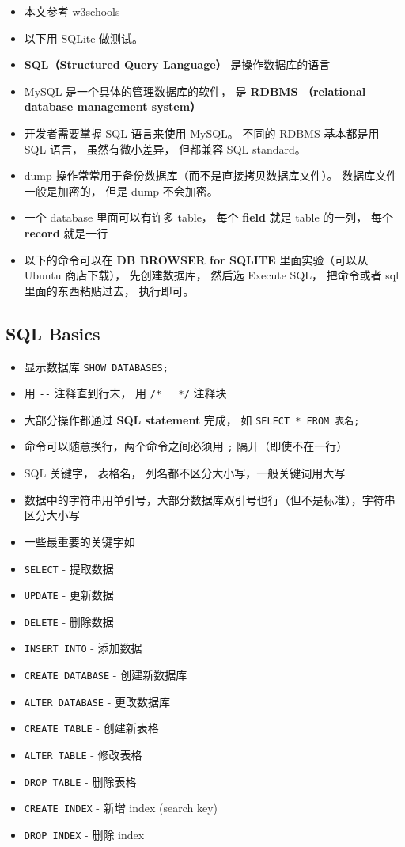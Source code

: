 
\begin{issues}
\issueDraft
\end{issues}

\begin{itemize}
\item 本文参考 \href{https://www.w3schools.com/sql/default.asp}{w3schools}
\item 以下用 SQLite 做测试。
\item \textbf{SQL（Structured Query Language）} 是操作数据库的语言
\item MySQL 是一个具体的管理数据库的软件， 是 \textbf{RDBMS （relational database management system）}
\item 开发者需要掌握 SQL 语言来使用 MySQL。 不同的 RDBMS 基本都是用 SQL 语言， 虽然有微小差异， 但都兼容 SQL standard。
\item dump 操作常常用于备份数据库（而不是直接拷贝数据库文件）。 数据库文件一般是加密的， 但是 dump 不会加密。
\item 一个 database 里面可以有许多 table， 每个 \textbf{field} 就是 table 的一列， 每个 \textbf{record} 就是一行
\item 以下的命令可以在 \textbf{DB BROWSER for SQLITE} 里面实验（可以从 Ubuntu 商店下载）， 先创建数据库， 然后选 Execute SQL， 把命令或者 sql 里面的东西粘贴过去， 执行即可。
\end{itemize}

\subsection{SQL Basics}
\begin{itemize}
\item 显示数据库 \verb`SHOW DATABASES;`
\item 用 \verb|--| 注释直到行末， 用 \verb|/*   */| 注释块
\item 大部分操作都通过 \textbf{SQL statement} 完成， 如 \verb`SELECT * FROM 表名;`
\item 命令可以随意换行，两个命令之间必须用 \verb|;| 隔开（即使不在一行）
\item SQL 关键字， 表格名， 列名都不区分大小写，一般关键词用大写
\item 数据中的字符串用单引号，大部分数据库双引号也行（但不是标准），字符串区分大小写
\item 一些最重要的关键字如
\item \verb`SELECT` - 提取数据
\item \verb`UPDATE` - 更新数据
\item \verb`DELETE` - 删除数据
\item \verb`INSERT INTO` - 添加数据
\item \verb`CREATE DATABASE` - 创建新数据库
\item \verb`ALTER DATABASE` - 更改数据库
\item \verb`CREATE TABLE` - 创建新表格
\item \verb`ALTER TABLE` - 修改表格
\item \verb`DROP TABLE` - 删除表格
\item \verb`CREATE INDEX` - 新增 index (search key)
\item \verb`DROP INDEX` - 删除 index
\end{itemize}

